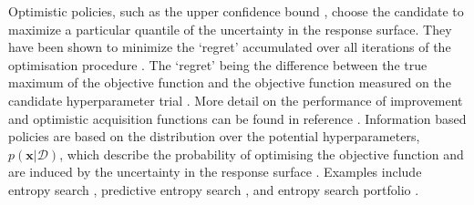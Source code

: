 Optimistic policies, such as the upper confidence bound \cite{icml2010_129}, choose the candidate to maximize a particular quantile of the uncertainty in the response surface. They have been shown to minimize the `regret' accumulated over all iterations of the optimisation procedure \cite{icml2010_129}. The `regret' being the difference between the true maximum of the objective function and the objective function measured on the candidate hyperparameter trial \cite{berger2013statistical}. More detail on the performance of improvement and optimistic acquisition functions can be found in reference \cite{jones2001taxonomy}. Information based policies are based on the distribution over the potential hyperparameters, $p(\mathbf{x}|\mathcal{D})$, which describe the probability of optimising the objective function and are induced by the uncertainty in the response surface \cite{shahriariTakingHumanOut2016}. Examples include entropy search \cite{hennig2012entropy}, predictive entropy search \cite{hernandez2014predictive}, and entropy search portfolio \cite{shahriariEntropySearchPortfolio2015}. 

